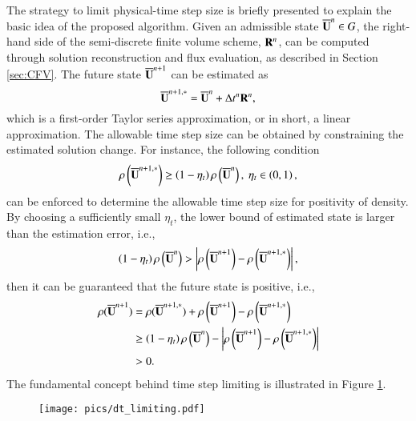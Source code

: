 The strategy to limit physical-time step size is briefly presented to explain the basic idea of the proposed algorithm. Given an admissible state $\overline{\mathbf{U}}^n \in G$, the right-hand side of the semi-discrete finite volume scheme, $\mathbf{R}^n$, can be computed through solution reconstruction and flux evaluation, as described in Section \ref{sec:CFV}. The future state $\overline{\mathbf{U}}^{n+1}$ can be estimated as
\begin{equation}
    \overline{\mathbf{U}}^{n+1,*}=\overline{\mathbf{U}}^n + \mathrm\Delta t^n \mathbf{R}^n,
\end{equation}
which is a first-order Taylor series approximation, or in short, a linear approximation. The allowable time step size can be obtained by constraining the estimated solution change. For instance, the following condition
\begin{equation}
    \rho \left(\overline{\mathbf{U}}^{n+1,*}\right) \geq \left(1-\eta_t \right) \rho \left(\overline{\mathbf{U}}^n\right), \ \eta_t \in \left(0,1\right),
\end{equation}
can be enforced to determine the allowable time step size for positivity of density. By choosing a sufficiently small $\eta_t$, the lower bound of estimated state is larger than the estimation error, i.e.,
\begin{equation}
    \left(1-\eta_t \right) \rho \left(\overline{\mathbf{U}}^n\right) > \left|\rho\left(\overline{\mathbf{U}}^{n+1}\right)-\rho\left(\overline{\mathbf{U}}^{n+1,*}\right) \right|,
\end{equation}
then it can be guaranteed that the future state is positive, i.e.,
\begin{equation}
\begin{aligned}
    \rho(\overline{\mathbf{U}}^{n+1}) &= \rho(\overline{\mathbf{U}}^{n+1,*}) + \rho\left(\overline{\mathbf{U}}^{n+1}\right)-\rho\left(\overline{\mathbf{U}}^{n+1,*}\right)  \\
    &\geq \left(1-\eta_t \right) \rho \left(\overline{\mathbf{U}}^n\right) - 
    \left|\rho\left(\overline{\mathbf{U}}^{n+1}\right)-\rho\left(\overline{\mathbf{U}}^{n+1,*}\right) \right| \\
    &>0.
\end{aligned}
\end{equation}
The fundamental concept behind time step limiting is illustrated in Figure \ref{fig:dt_limiting}.

\begin{figure}[htbp!]
    \centering
    \texttt{[image: pics/dt\_limiting.pdf]}
    \caption{}
    \label{fig:dt_limiting}
\end{figure}

